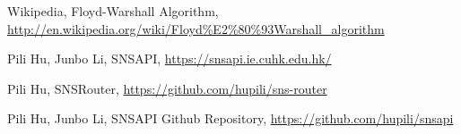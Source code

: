 	Wikipedia, Floyd-Warshall Algorithm, 
	\url{http://en.wikipedia.org/wiki/Floyd%E2%80%93Warshall_algorithm}

	Pili Hu, Junbo Li, SNSAPI, \url{https://snsapi.ie.cuhk.edu.hk/}

	Pili Hu, SNSRouter, \url{https://github.com/hupili/sns-router}

	Pili Hu, Junbo Li, SNSAPI Github Repository, \url{https://github.com/hupili/snsapi}
